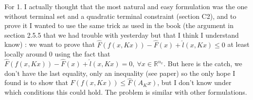 \documentclass[12pt]{article}
\numberwithin{theorem}{section} %
\theoremstyle{definition}
\theoremstyle{remark}
\newcommand{\R}{\mathbb{R}}
\begin{document}
For 1. I actually thought that the most natural and easy formulation was the one without terminal set and a quadratic terminal constraint (section C2), and to prove it I wanted to use the same trick as used in the book (the argument in section 2.5.5 that we had trouble with yesterday but that I think I understand know) : we want to prove that $\hat{F}(f(x,Kx))-\hat{F}(x)+\hat{l}(x,Kx)\leq 0$ at least locally around 0 using the fact that $\hat{F}(f(x,Kx))-\hat{F}(x)+\hat{l}(x,Kx)= 0,~\forall x\in\R^{n_x}$.
But here is the catch, we don't have the last equality, only an inequality (see paper) so the only hope I found is to show that $\hat{F}(f(x,Kx))\leq \hat{F}(A_Kx)$, but I don't know under which conditions this could hold.
The problem is similar with other formulations.
\end{document}
